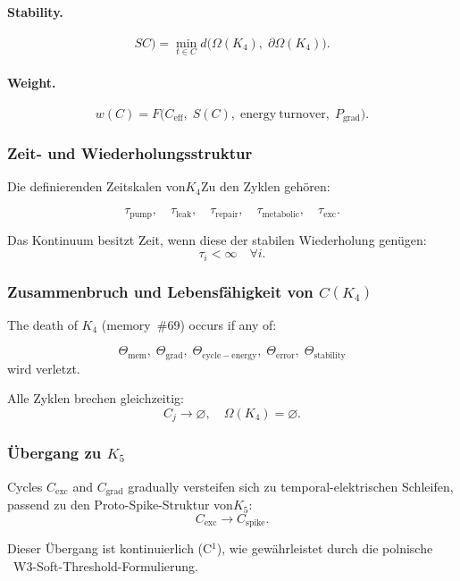 \paragraph{Stability.}
\[
SC)
   = \min_{t\in C}
       d\bigl(
         \Omega(K_4),\;
         \partial\Omega(K_4)
       \bigr).
\]

\paragraph{Weight.}
\[
  w(C)=F\bigl(
        C_{\mathrm{eff}},\;
        S(C),\;
        \mathrm{energy\ turnover},\;
        P_{\mathrm{grad}}
      \bigr).
\]

\subsubsection{Zeit- und Wiederholungsstruktur}

Die definierenden Zeitskalen von$K_4$Zu den Zyklen gehören:

\[
  \tau_{\mathrm{pump}},\quad
  \tau_{\mathrm{leak}},\quad
  \tau_{\mathrm{repair}},\quad
  \tau_{\mathrm{metabolic}},\quad
  \tau_{\mathrm{exc}}.
\]

Das Kontinuum besitzt Zeit, wenn diese der stabilen Wiederholung genügen:
\[
  \tau_i<\infty \quad\forall i.
\]

\subsubsection{Zusammenbruch und Lebensfähigkeit von \texorpdfstring{$C(K_4)$}{C(K_4)}}

The death of $K_4$ (memory~\#69) occurs if any of:

\[
  \Theta_{\mathrm{mem}},\;
  \Theta_{\mathrm{grad}},\;
  \Theta_{\mathrm{cycle-energy}},\;
  \Theta_{\mathrm{error}},\;
  \Theta_{\mathrm{stability}}
\]
wird verletzt.

Alle Zyklen brechen gleichzeitig:
\[
  C_j \to \varnothing,
\quad
  \Omega(K_4)=\varnothing.
\]

\subsubsection{Übergang zu \texorpdfstring{$K_5$}{K_5}}

Cycles $C_{\mathrm{exc}}$ and $C_{\mathrm{grad}}$ gradually 
versteifen sich zu temporal-elektrischen Schleifen, passend zu den
Proto-Spike-Struktur von$K_5$:
\[
  C_{\mathrm{exc}}\longrightarrow C_{\mathrm{spike}}.
\]

Dieser Übergang ist kontinuierlich (C$^1$), wie gewährleistet durch
die polnische ~W3-Soft-Threshold-Formulierung.


